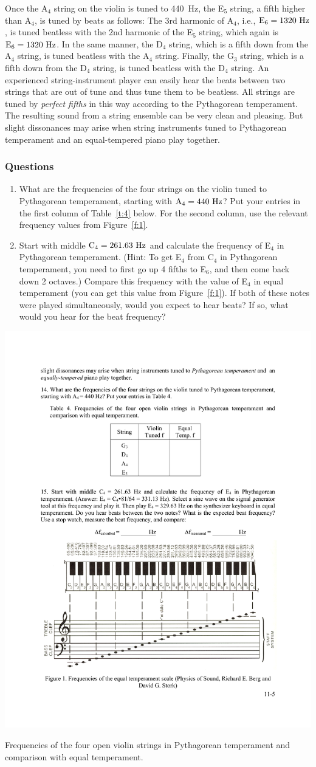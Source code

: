 \documentclass[11pt]{NSF}
\def\ben{\begin{enumerate}}
\def\een{\end{enumerate}}
\begin{document}
Once the A$_4$ string on the violin is tuned to 440~Hz, 
the E$_5$ string, a fifth higher than A$_4$, is tuned by beats
as follows: 
The 3rd harmonic of A$_4$, i.e., ${\rm E}_6 = 1320~{\rm Hz}$, 
is tuned beatless with the 2nd harmonic of the E$_5$ string,
which again is ${\rm E}_6 = 1320~{\rm Hz}$. 
In the same manner, the D$_4$ string, which is a fifth down 
from the A$_4$ string, is tuned beatless with the A$_4$ string. 
Finally, the G$_3$ string, which is a fifth down from the D$_4$
string, is tuned beatless with the D$_4$ string. 
An experienced string-instrument player can easily hear the beats 
between two strings that
are out of tune and thus tune them to be beatless. All strings are
tuned by {\em perfect fifths} in this way according to the Pythagorean
temperament. The resulting sound from a string ensemble can be very
clean and pleasing. But slight dissonances may arise when string
instruments tuned to Pythagorean temperament and an equal-tempered
piano play together.

\subsubsection*{Questions}
\ben
\item
What are the frequencies of the four strings on the violin tuned to
Pythagorean temperament, starting with ${\rm A}_4 = 440~{\rm Hz}$? 
Put your entries in the first column of Table~\ref{t:4} below.
For the second column, use the relevant frequency values from Figure~\ref{f:1}.

\item
Start with middle ${\rm C}_4 = 261.63~{\rm Hz}$ and calculate 
the frequency of E$_4$ in Pythagorean temperament. 
(Hint: To get E$_4$ from C$_4$ in Pythagorean temperament,
you need to first go up 4 fifths to E$_6$, and then come 
back down 2 octaves.)
Compare this frequency with the value of E$_4$ in equal 
temperament (you can get this value from  Figure~\ref{f:1}).
If both of these notes were played simultaneously, would you 
expect to hear beats?
If so, what would you hear for the beat frequency?

\een
%
\begin{table}[hbtp]
\begin{center}
\includegraphics[width=.35\textwidth]{tab11_4}
\caption{Frequencies of the four open violin strings in Pythagorean
temperament and comparison with equal temperament.}
\label{t:4}
\end{center}
\end{table}
%
\end{document}
